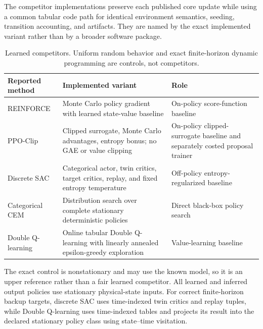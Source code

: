 
The competitor implementations preserve each published core update while
using a common tabular code path for identical environment semantics, seeding,
transition accounting, and artifacts.  They are named by the exact implemented
variant rather than by a broader software package.

\begin{table}[t]
  \centering
  \footnotesize
  \caption{Learned competitors.  Uniform random behavior and exact
  finite-horizon dynamic programming are controls, not competitors.}
  \label{tab:competitors}
  \begin{tabular}{@{}p{26mm}p{62mm}p{37mm}@{}}
    \toprule
    Reported method & Implemented variant & Role \\
    \midrule
    REINFORCE & Monte Carlo policy gradient with learned state-value baseline
      \citep{williams1992} & On-policy score-function baseline \\
    PPO-Clip & Clipped surrogate, Monte Carlo advantages, entropy bonus; no GAE
      or value clipping \citep{schulman2017} & On-policy clipped-surrogate baseline and
      separately costed proposal trainer \\
    Discrete SAC & Categorical actor, twin critics, target critics, replay, and
      fixed entropy temperature \citep{christodoulou2019} & Off-policy
      entropy-regularized baseline \\
    Categorical CEM & Distribution search over complete stationary
      deterministic policies \citep{mannorEtAl2003} & Direct black-box policy
      search \\
    Double Q-learning & Online tabular Double Q-learning with linearly annealed
      epsilon-greedy exploration \citep{vanHasselt2010} & Value-learning
      baseline \\
    \bottomrule
  \end{tabular}
\end{table}

The exact control is nonstationary and may use the known model, so it is an
upper reference rather than a fair learned competitor.  All learned and
inferred output policies use stationary physical-state inputs.  For correct
finite-horizon backup targets, discrete SAC uses time-indexed twin critics and
replay tuples, while Double Q-learning uses time-indexed tables and projects its
result into the declared stationary policy class using state--time visitation.


